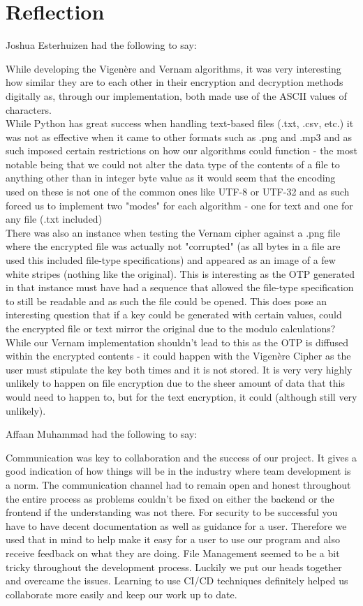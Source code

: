 \documentclass[a4paper, 12pt, titlepage]{report}
\begin{document}
\section{Reflection}
Joshua Esterhuizen had the following to say:
\begin{displayquote}
While developing the Vigenère and Vernam algorithms, it was very interesting how similar they are to each other in their encryption and decryption methods digitally as, through our implementation, both made use of the ASCII values of characters.
\\
While Python has great success when handling text-based files (.txt, .csv, etc.) it was not as effective when it came to other formats such as .png and .mp3 and as such imposed certain restrictions on how our algorithms could function - the most notable being that we could not alter the data type of the contents of a file to anything other than in integer byte value as it would seem that the encoding used on these is not one of the common ones like UTF-8 or UTF-32 and as such forced us to implement two "modes" for each algorithm - one for text and one for any file (.txt included)
\\
There was also an instance when testing the Vernam cipher against a .png file where the encrypted file was actually not "corrupted" (as all bytes in a file are used this included file-type specifications) and appeared as an image of a few white stripes (nothing like the original). This is interesting as the OTP generated in that instance must have had a sequence that allowed the file-type specification to still be readable and as such the file could be opened. This does pose an interesting question that if a key could be generated with certain values, could the encrypted file or text mirror the original due to the modulo calculations? While our Vernam implementation shouldn't lead to this as the OTP is diffused within the encrypted contents - it could happen with the Vigenère Cipher as the user must stipulate the key both times and it is not stored. It is very very highly unlikely to happen on file encryption due to the sheer amount of data that this would need to happen to, but for the text encryption, it could (although still very unlikely).
\end{displayquote}
\pagebreak
Affaan Muhammad had the following to say:
\begin{displayquote}
Communication was key to collaboration and the success of our project. It gives a good indication of how things will be in the industry where team development is a norm. The communication channel had to remain open and honest throughout the entire process as problems couldn't be fixed on either the backend or the frontend if the understanding was not there. For security to be successful you have to have decent documentation as well as guidance for a user. Therefore we used that in mind to help make it easy for a user to use our program and also receive feedback on what they are doing.
File Management seemed to be a bit tricky throughout the development process. Luckily we put our heads together and overcame the issues.
Learning to use CI/CD techniques definitely helped us collaborate more easily and keep our work up to date.
\end{displayquote}
\end{document}
